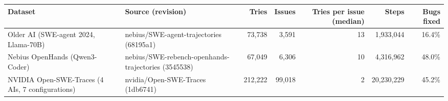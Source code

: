 \begin{tabular}{llrrrrr}
\toprule
Dataset & Source (revision) & Tries & Issues & Tries per issue (median) & Steps & Bugs fixed \\
\midrule
Older AI (SWE-agent 2024, Llama-70B) & nebius/SWE-agent-trajectories (68195a1) & 73,738 & 3,591 & 13 & 1,933,044 & 16.4\% \\
Nebius OpenHands (Qwen3-Coder) & nebius/SWE-rebench-openhands-trajectories (3545538) & 67,049 & 6,306 & 10 & 4,316,962 & 48.0\% \\
NVIDIA Open-SWE-Traces (4 AIs, 7 configurations) & nvidia/Open-SWE-Traces (1db6741) & 212,222 & 99,018 & 2 & 20,230,229 & 45.2\% \\
\bottomrule
\end{tabular}
